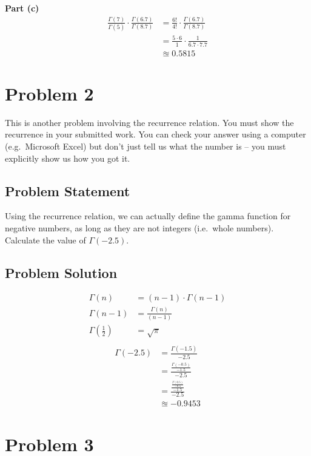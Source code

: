 \documentclass[12pt]{article}
\theoremstyle{definition}
\begin{document}
\vspace{2in}
\noindent
{\bf Part (c)}
\begin{align*}
\frac{ \Gamma(7) }{\Gamma(5)} \cdot \frac{\Gamma(6.7)}{\Gamma(8.7)} &= \frac{6!}{4!} \cdot \frac{\Gamma(6.7)}{\Gamma(8.7)}\\
&= \frac{5 \cdot 6}{1} \cdot \frac{1}{6.7 \cdot 7.7}\\
&\approxeq 0.5815
\end{align*}

\newpage
\section*{Problem 2}

This is another problem involving the recurrence relation. You must show the recurrence in your submitted work. You can check your answer using a computer (e.g.\ Microsoft Excel) but don't just tell us what the number is -- you must explicitly show us how you got it.

\subsection*{Problem Statement}

Using the recurrence relation, we can actually define the gamma function for negative numbers, as long as they are not integers (i.e.\ whole numbers). Calculate the value of $\Gamma(-2.5)$.

\subsection*{Problem Solution}
\begin{align*}
\Gamma(n) &= (n - 1) \cdot \Gamma(n - 1)\\
\Gamma(n - 1) &= \frac{\Gamma(n)}{(n - 1)}\\
\Gamma(\frac{1}{2}) &= \sqrt{\pi}\\
\end{align*}
\begin{align*}
\Gamma(-2.5) &= \frac{\Gamma(-1.5)}{-2.5}\\
&= \frac{\frac{\Gamma(-0.5)}{-1.5}}{-2.5}\\
&= \frac{\frac{\frac{\Gamma(0.5)}{-0.5}}{-1.5}}{-2.5}\\
&\approxeq -0.9453
\end{align*}

\newpage
\section*{Problem 3}
\end{document}
